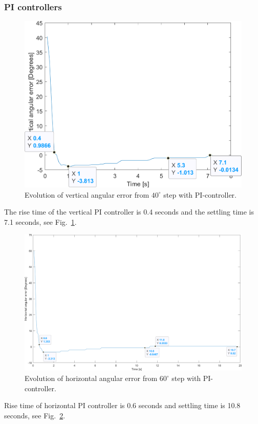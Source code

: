\subsubsection{PI controllers}
\label{sec:simon13}
\begin{figure}[h]
\centering
\includegraphics[width=\linewidth]{sections/assets/Vertical_PI_controller.png}
\caption{Evolution of vertical angular error from \(40^{\circ}\) step with PI-controller.}
\label{vert_PI}
\end{figure}
The rise time of the vertical PI controller is 0.4 seconds and the settling time is 7.1 seconds, see Fig.~\ref{vert_PI}.
\begin{figure}[h]
\centering
\includegraphics[width=\linewidth]{sections/assets/Horizontal_PI_controller.png}
\caption{Evolution of horizontal angular error from \(60^{\circ}\) step with PI-controller.}
\label{Horizontal_PI}
\end{figure}
Rise time of horizontal PI controller is 0.6 seconds and settling time is 10.8 seconds, see Fig.~\ref{Horizontal_PI}.

